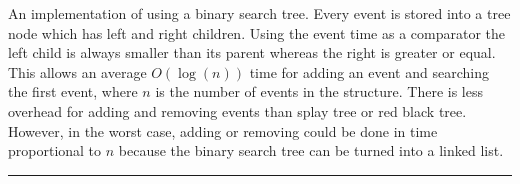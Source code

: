 
An implementation of  using a binary search tree.
Every event is stored into a tree node which has left and right children.
Using the event time as a comparator %
the left child is always smaller
than its parent whereas the right is greater or equal.  This allows
an average $O(\log (n))$ time for adding an event
and searching the first event,
where $n$ is the number of events in the structure.
There is less overhead for adding and removing events than splay tree
or red black tree.
However, in the worst case, adding or removing could
be done in time proportional to $n$ because the binary search tree can be turned
into a linked list.

\bigskip\hrule

